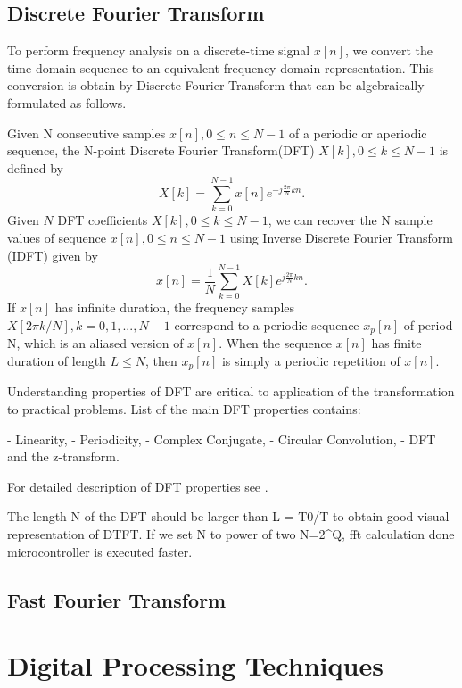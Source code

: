 \documentclass[twoside]{ctuthesis}
\theoremstyle{plain}
\theoremstyle{definition}
\theoremstyle{note}
\begin{document}
\subsection{Discrete Fourier Transform}
To perform frequency analysis on a discrete-time signal ${x[n]}$, we convert the time-domain sequence to an equivalent frequency-domain representation. This conversion is obtain by Discrete Fourier Transform that can be algebraically formulated as follows.\cite{cite:2,cite:3}
	
Given N consecutive samples $x[n], 0 \leq n \leq N-1$ of a periodic or aperiodic sequence, the N-point Discrete Fourier Transform(DFT) $X[k], 0 \leq k \leq N-1$ is defined by
\begin{equation} \label{eq:DFT}
X[k]=\sum_{k=0}^{N-1}x[n]e^{-j \frac{2 \pi}{N} kn}.
\end{equation}
Given $N$ DFT coefficients $X[k], 0 \leq k \leq N-1$, we can recover the N sample values of sequence $x[n], 0 \leq n \leq N-1$ using Inverse Discrete Fourier Transform (IDFT) given by
\begin{equation} \label{eq:IDFT}
x[n]=\frac{1}{N} \sum_{k=0}^{N-1}X[k]e^{j \frac{2 \pi}{N} kn}.
\end{equation}
If $x[n]$ has infinite duration, the frequency samples  $X[2 \pi k/ N], k=0, 1, ..., N-1$ correspond to a periodic sequence $x_{p}[n]$ of period N, which is an aliased version of $x[n]$. When the sequence $x[n]$ has finite duration of length $L \leq N$, then  $x_{p}[n]$ is simply a periodic repetition of $x[n]$.

Understanding properties of DFT are critical to application of the transformation to practical problems. List of the main DFT properties contains:

- Linearity,
- Periodicity,
- Complex Conjugate,
- Circular Convolution,
- DFT and the z-transform.

For detailed description of DFT properties see \cite{cite:2,cite:RT_DSP}.

The length N of the DFT should be larger than L = T0/T to obtain good visual representation of DTFT. If we set N to power of two N=2^Q, fft calculation done microcontroller is executed faster.
\subsection{Fast Fourier Transform}
\section{Digital Processing Techniques}
\end{document}
